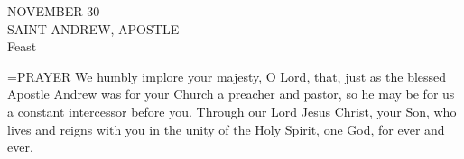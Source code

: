 \begin{center}\normalsize NOVEMBER 30\\
\footnotesize SAINT ANDREW, APOSTLE\\
\footnotesize Feast\\
\end{center}

\hangindent=\parindent \small{PRAYER 
We humbly implore your majesty, O Lord,
that, just as the blessed Apostle Andrew
was for your Church a preacher and pastor,
so he may be for us a constant intercessor before you.
Through our Lord Jesus Christ, your Son,
who lives and reigns with you in the unity of the Holy Spirit,
one God, for ever and ever.\\}
 
